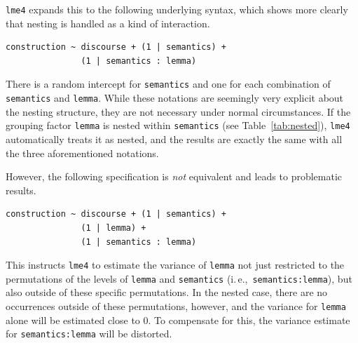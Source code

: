 \documentclass[a4paper,12pt]{article}
\newcommand{\ie}{i.\,e.,\ }
\begin{document}
\texttt{lme4} expands this to the following underlying syntax, which shows more clearly that nesting is handled as a kind of interaction.

\vspace{0.5\baselineskip}

\begin{lstlisting}
construction ~ discourse + (1 | semantics) +
               (1 | semantics : lemma)
\end{lstlisting}

There is a random intercept for \texttt{semantics} and one for each combination of \texttt{semantics} and \texttt{lemma}.
While these notations are seemingly very explicit about the nesting structure, they are not necessary under normal circumstances.
If the grouping factor \texttt{lemma} is nested within \texttt{semantics} (see Table~\ref{tab:nested}), \texttt{lme4} automatically treats it as nested, and the results are exactly the same with all the three aforementioned notations.

However, the following specification is \textit{not} equivalent and leads to problematic results.

\vspace{0.5\baselineskip}

\begin{lstlisting}
construction ~ discourse + (1 | semantics) +
               (1 | lemma) +
               (1 | semantics : lemma)
\end{lstlisting}

This instructs \texttt{lme4} to estimate the variance of \texttt{lemma} not just restricted to the permutations of the levels of \texttt{lemma} and \texttt{semantics} (\ie \texttt{semantics:lemma}), but also outside of these specific permutations.
In the nested case, there are no occurrences outside of these permutations, however, and the variance for \texttt{lemma} alone will be estimated close to $0$.
To compensate for this, the variance estimate for \texttt{semantics:lemma} will be distorted.
\end{document}
